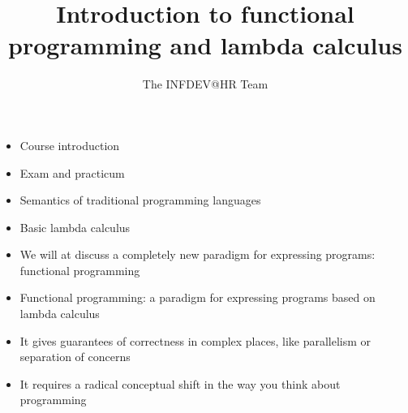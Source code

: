\documentclass{beamer}
\title{Introduction to functional programming and lambda calculus}
\author{The INFDEV@HR Team}
\institute{Hogeschool Rotterdam \\ 
Rotterdam, Netherlands}
\date{}
\begin{document}
\maketitle
{}
\begin{frame}[fragile]{\CurrentSection}
\begin{block}{\CurrentSubSection}
\begin{itemize}
\item Course introduction
\item Exam and practicum
\item Semantics of traditional programming languages
\item Basic lambda calculus

\end{itemize}

\end{block}


\end{frame}

\begin{frame}[fragile]{\CurrentSection}
\begin{block}{\CurrentSubSection}
\begin{itemize}
\item We will at discuss a completely new paradigm for expressing programs: functional programming
\item Functional programming: a paradigm for expressing programs based on lambda calculus
\item It gives guarantees of correctness in complex places, like parallelism or separation of concerns
\item It requires a radical conceptual shift in the way you think about programming

\end{itemize}

\end{block}


\end{frame}
\end{document}

